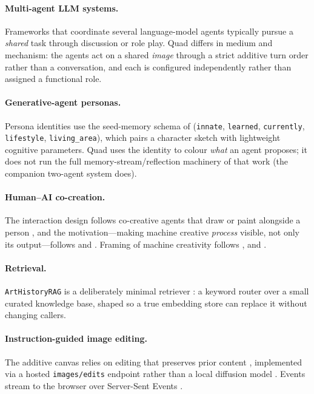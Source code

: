 \documentclass[11pt]{article}
\newcommand{\code}[1]{\texttt{\small #1}}
\newcommand{\RAG}{\code{ArtHistoryRAG}}
\begin{document}
\paragraph{Multi-agent LLM systems.}
Frameworks that coordinate several language-model agents
\citep{li2023camel,hong2024metagpt,wu2024autogen,du2024debate} typically pursue a
\emph{shared} task through discussion or role play. Quad differs in medium and
mechanism: the agents act on a shared \emph{image} through a strict additive turn
order rather than a conversation, and each is configured independently rather than
assigned a functional role.

\paragraph{Generative-agent personas.}
Persona identities use the seed-memory schema of \citet{park2023generative}
(\code{innate}, \code{learned}, \code{currently}, \code{lifestyle},
\code{living\_area}), which pairs a character sketch with lightweight cognitive
parameters. Quad uses the identity to colour \emph{what} an agent proposes; it
does not run the full memory-stream/reflection machinery of that work (the
companion two-agent system does).

\paragraph{Human--AI co-creation.}
The interaction design follows co-creative agents that draw or paint alongside a
person \citep{davis2016empirically,oh2018lead,karimi2020creative}, and the
motivation---making machine creative \emph{process} visible, not only its
output---follows \citet{epstein2023art} and \citet{doshi2024generative}. Framing
of machine creativity follows \citet{boden2004creative},
\citet{colton2012computational} and \citet{ritchie2007some}.

\paragraph{Retrieval.}
\RAG{} is a deliberately minimal retriever \citep{lewis2020retrieval}: a keyword
router over a small curated knowledge base, shaped so a true embedding store can
replace it without changing callers.

\paragraph{Instruction-guided image editing.}
The additive canvas relies on editing that preserves prior content
\citep{meng2022sdedit,hertz2023prompt,brooks2023instructpix2pix}, implemented via a
hosted \code{images/edits} endpoint \citep{microsoft2025azure} rather than a local
diffusion model \citep{rombach2022high}. Events stream to the browser over
Server-Sent Events \citep{whatwg2024sse}.
\end{document}
